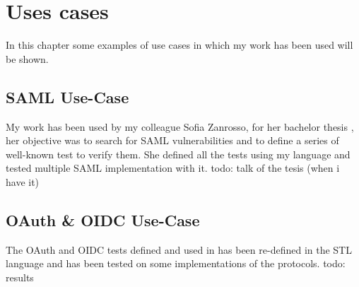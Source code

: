 \chapter{Uses cases}
In this chapter some examples of use cases in which my work has been used will be shown.

\section{SAML Use-Case}
My work has been used by my colleague Sofia Zanrosso, for her bachelor thesis  \cite{sofia_zanrosso}, her objective was to search for SAML vulnerabilities and to define a series of well-known test to verify them.
She defined all the tests using my language and tested multiple SAML implementation with it.
todo: talk of the tesis (when i have it)

\section{OAuth \& OIDC Use-Case}
The OAuth and OIDC tests defined and used in \cite{claudio_grisenti}\cite{wendy_barreto} has been re-defined in the STL language and has been tested on some implementations of the protocols.
todo: results 



